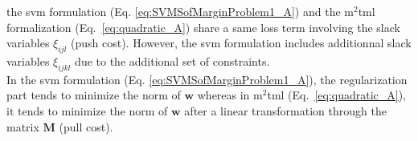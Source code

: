 \noindent the {\sc svm} formulation (Eq. \ref{eq:SVMSofMarginProblem1_A}) and the {\sc m$^2$tml} formalization (Eq.~\ref{eq:quadratic_A}) share a same loss term involving the slack variables $\xi_{ijl}$ (push cost). However, the {\sc svm} formulation includes additionnal slack variables $\xi_{ijkl}$ due to the additional set of constraints. \\
\noindent In the {\sc svm} formulation (Eq. \ref{eq:SVMSofMarginProblem1_A}), the regularization part tends to minimize the norm of $\textbf{w}$ whereas in {\sc m$^2$tml} (Eq.~\ref{eq:quadratic_A}), it tends to minimize the norm of $\textbf{w}$ after a linear transformation through the matrix $\textbf{M}$ (pull cost). 


